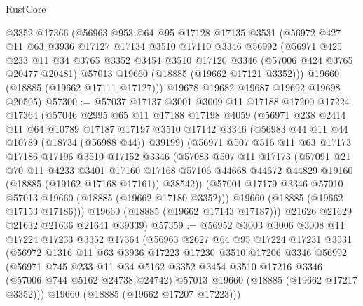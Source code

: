 \begin{lexlean}{RustCore}
\begin{coremodule}
    @3352
    @17366
    (@56963
      @953
      @64
      @95
      @17128
      @17135
      @3531
      (@56972
        @427
        @11
        @63
        @3936
        @17127
        @17134
        @3510
        @17110
        @3346
        @56992
        (@56971
          @425
          @233
          @11
          @34
          @3765
          @3352
          @3454
          @3510
          @17120
          @3346
          (@57006 @424 @3765 @20477 @20481)
          @57013
          @19660
          (@18885 (@19662 @17121 @3352)))
        @19660
        (@18885 (@19662 @17111 @17127)))
      @19678
      @19682
      @19687
      @19692
      @19698
      @20505)
@57300 := @57037
    @17137
    @3001
    @3009
    @11
    @17188
    @17200
    @17224
    @17364
    (@57046
      @2995
      @65
      @11
      @17188
      @17198
      @4059
      (@56971
        @238
        @2414
        @11
        @64
        @10789
        @17187
        @17197
        @3510
        @17142
        @3346
        (@56983 @44 @11 @44 @10789 (@18734 (@56988 @44)) @39199)
        (@56971
          @507
          @516
          @11
          @63
          @17173
          @17186
          @17196
          @3510
          @17152
          @3346
          (@57083
            @507
            @11
            @17173
            (@57091
              @21
              @70
              @11
              @4233
              @3401
              @17160
              @17168
              @57106
              @44668
              @44672
              @44829
              @19160
              (@18885 (@19162 @17168 @17161))
              @38542))
          (@57001 @17179 @3346 @57010 @57013 @19660 (@18885 (@19662 @17180 @3352)))
          @19660
          (@18885 (@19662 @17153 @17186)))
        @19660
        (@18885 (@19662 @17143 @17187)))
      @21626
      @21629
      @21632
      @21636
      @21641
      @39339)
@57359 := @56952
    @3003
    @3006
    @3008
    @11
    @17224
    @17233
    @3352
    @17364
    (@56963
      @2627
      @64
      @95
      @17224
      @17231
      @3531
      (@56972
        @1316
        @11
        @63
        @3936
        @17223
        @17230
        @3510
        @17206
        @3346
        @56992
        (@56971
          @745
          @233
          @11
          @34
          @5162
          @3352
          @3454
          @3510
          @17216
          @3346
          (@57006 @744 @5162 @24738 @24742)
          @57013
          @19660
          (@18885 (@19662 @17217 @3352)))
        @19660
        (@18885 (@19662 @17207 @17223)))

\end{coremodule}
\end{lexlean}
